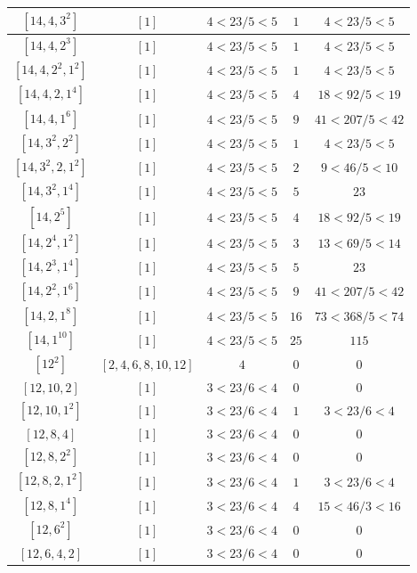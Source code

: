\documentclass{article}%
\begin{document}
\begin{center}
\begin{longtable}{||c|c|c|c|c||}
$[14, 4, 3^{2}]$ & $[1]$ & $4 < 23/5 < 5$ & $1$ & $4 < 23/5 < 5$ \\ \hline 
$[14, 4, 2^{3}]$ & $[1]$ & $4 < 23/5 < 5$ & $1$ & $4 < 23/5 < 5$ \\ \hline 
$[14, 4, 2^{2}, 1^{2}]$ & $[1]$ & $4 < 23/5 < 5$ & $1$ & $4 < 23/5 < 5$ \\ \hline 
$[14, 4, 2, 1^{4}]$ & $[1]$ & $4 < 23/5 < 5$ & $4$ & $18 < 92/5 < 19$ \\ \hline 
$[14, 4, 1^{6}]$ & $[1]$ & $4 < 23/5 < 5$ & $9$ & $41 < 207/5 < 42$ \\ \hline 
$[14, 3^{2}, 2^{2}]$ & $[1]$ & $4 < 23/5 < 5$ & $1$ & $4 < 23/5 < 5$ \\ \hline 
$[14, 3^{2}, 2, 1^{2}]$ & $[1]$ & $4 < 23/5 < 5$ & $2$ & $9 < 46/5 < 10$ \\ \hline 
$[14, 3^{2}, 1^{4}]$ & $[1]$ & $4 < 23/5 < 5$ & $5$ & $23$ \\ \hline 
$[14, 2^{5}]$ & $[1]$ & $4 < 23/5 < 5$ & $4$ & $18 < 92/5 < 19$ \\ \hline 
$[14, 2^{4}, 1^{2}]$ & $[1]$ & $4 < 23/5 < 5$ & $3$ & $13 < 69/5 < 14$ \\ \hline 
$[14, 2^{3}, 1^{4}]$ & $[1]$ & $4 < 23/5 < 5$ & $5$ & $23$ \\ \hline 
$[14, 2^{2}, 1^{6}]$ & $[1]$ & $4 < 23/5 < 5$ & $9$ & $41 < 207/5 < 42$ \\ \hline 
$[14, 2, 1^{8}]$ & $[1]$ & $4 < 23/5 < 5$ & $16$ & $73 < 368/5 < 74$ \\ \hline 
$[14, 1^{10}]$ & $[1]$ & $4 < 23/5 < 5$ & $25$ & $115$ \\ \hline 
$[12^{2}]$ & $[2, 4, 6, 8, 10, 12]$ & $4$ & $0$ & $0$ \\ \hline 
$[12, 10, 2]$ & $[1]$ & $3 < 23/6 < 4$ & $0$ & $0$ \\ \hline 
$[12, 10, 1^{2}]$ & $[1]$ & $3 < 23/6 < 4$ & $1$ & $3 < 23/6 < 4$ \\ \hline 
$[12, 8, 4]$ & $[1]$ & $3 < 23/6 < 4$ & $0$ & $0$ \\ \hline 
$[12, 8, 2^{2}]$ & $[1]$ & $3 < 23/6 < 4$ & $0$ & $0$ \\ \hline 
$[12, 8, 2, 1^{2}]$ & $[1]$ & $3 < 23/6 < 4$ & $1$ & $3 < 23/6 < 4$ \\ \hline 
$[12, 8, 1^{4}]$ & $[1]$ & $3 < 23/6 < 4$ & $4$ & $15 < 46/3 < 16$ \\ \hline 
$[12, 6^{2}]$ & $[1]$ & $3 < 23/6 < 4$ & $0$ & $0$ \\ \hline 
$[12, 6, 4, 2]$ & $[1]$ & $3 < 23/6 < 4$ & $0$ & $0$ \\ \hline 

\end{longtable}
\end{center}
\end{document}
